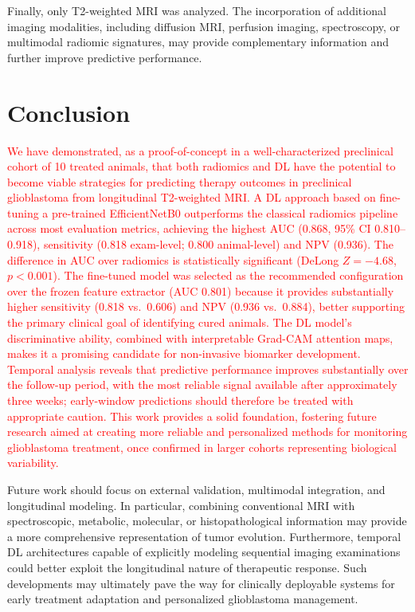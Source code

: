 \documentclass{article}
\begin{document}
Finally, only T2-weighted MRI was analyzed. The incorporation of additional imaging modalities, including diffusion MRI, perfusion imaging, spectroscopy, or multimodal radiomic signatures, may provide complementary information and further improve predictive performance.

\section{Conclusion}

\textcolor{red}{We have demonstrated, as a proof-of-concept in a well-characterized preclinical cohort of 10 treated animals, that both radiomics and DL have the potential to become viable strategies for predicting therapy outcomes in preclinical glioblastoma from longitudinal T2-weighted MRI. A DL approach based on fine-tuning a pre-trained EfficientNetB0 outperforms the classical radiomics pipeline across most evaluation metrics, achieving the highest AUC (0.868, 95\% CI 0.810--0.918), sensitivity (0.818 exam-level; 0.800 animal-level) and NPV (0.936). The difference in AUC over radiomics is statistically significant (DeLong $Z=-4.68$, $p<0.001$). The fine-tuned model was selected as the recommended configuration over the frozen feature extractor (AUC 0.801) because it provides substantially higher sensitivity (0.818 vs.\ 0.606) and NPV (0.936 vs.\ 0.884), better supporting the primary clinical goal of identifying cured animals. The DL model's discriminative ability, combined with interpretable Grad-CAM attention maps, makes it a promising candidate for non-invasive biomarker development. Temporal analysis reveals that predictive performance improves substantially over the follow-up period, with the most reliable signal available after approximately three weeks; early-window predictions should therefore be treated with appropriate caution. This work provides a solid foundation, fostering future research aimed at creating more reliable and personalized methods for monitoring glioblastoma treatment, once confirmed in larger cohorts representing biological variability.}

Future work should focus on external validation, multimodal integration, and longitudinal modeling. In particular, combining conventional MRI with spectroscopic, metabolic, molecular, or histopathological information may provide a more comprehensive representation of tumor evolution. Furthermore, temporal DL architectures capable of explicitly modeling sequential imaging examinations could better exploit the longitudinal nature of therapeutic response. Such developments may ultimately pave the way for clinically deployable systems for early treatment adaptation and personalized glioblastoma management.
\end{document}
